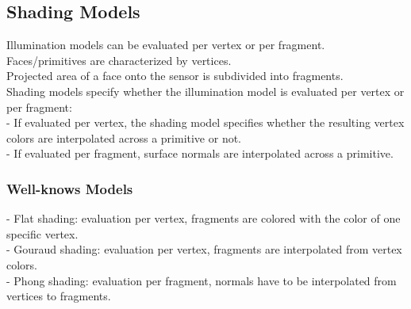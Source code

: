 \documentclass{article}
\begin{document}
\subsection{Shading Models} 
Illumination models can be evaluated per vertex or per fragment.\\
Faces/primitives are characterized by vertices.\\
Projected area of a face onto the sensor is subdivided into fragments.\\
Shading models specify whether the illumination model is evaluated per vertex or per fragment:\\
- If evaluated per vertex, the shading model specifies whether the resulting vertex colors are interpolated across a primitive or not.\\
- If evaluated per fragment, surface normals are interpolated across a primitive.\\
\subsubsection{Well-knows Models}
- Flat shading: evaluation per vertex, fragments are colored with the color of one specific vertex.\\
- Gouraud shading: evaluation per vertex, fragments are interpolated from vertex colors.\\ 
- Phong shading: evaluation per fragment, normals have to be interpolated from vertices to fragments.
\end{document}
